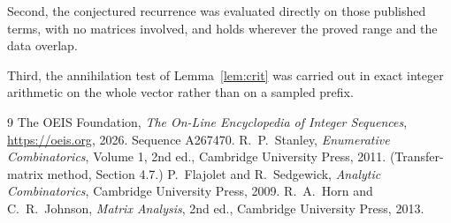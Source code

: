 \documentclass[11pt,a4paper]{article}
\theoremstyle{plain}
\theoremstyle{definition}
\begin{document}
Second, the conjectured recurrence was evaluated directly on those published terms, with no
matrices involved, and holds wherever the proved range and the data overlap.

Third, the annihilation test of Lemma~\ref{lem:crit} was carried out in exact integer
arithmetic on the whole vector rather than on a sampled prefix.

\begin{thebibliography}{9}
 The OEIS Foundation, \emph{The On-Line Encyclopedia of Integer
Sequences}, \url{https://oeis.org}, 2026. Sequence A267470.
 R.~P.~Stanley, \emph{Enumerative Combinatorics}, Volume 1, 2nd ed.,
Cambridge University Press, 2011. (Transfer-matrix method, Section 4.7.)
 P.~Flajolet and R.~Sedgewick, \emph{Analytic Combinatorics}, Cambridge
University Press, 2009.
 R.~A.~Horn and C.~R.~Johnson, \emph{Matrix Analysis}, 2nd ed., Cambridge
University Press, 2013.
\end{thebibliography}
\end{document}
